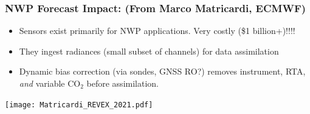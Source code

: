 \documentclass[10pt,t]{beamer}
\begin{document}
\begin{frame}
  \frametitle{NWP Forecast Impact: \small (From Marco Matricardi, ECMWF)}
  \vspace{-0.1in}
  \begin{small}
  \begin{itemize}
  \item Sensors exist primarily for NWP applications.  Very costly (\$1 billion+)!!!!
  \item They ingest radiances (small subset of channels) for data assimilation
  \item Dynamic bias correction (via sondes, GNSS RO?) removes instrument, RTA, \textit{and} variable CO$_2$ before assimilation.
\end{itemize}
  \end{small}
  \vspace{-0.45in}
  \texttt{[image: Matricardi\_REVEX\_2021.pdf]}
\end{frame}
\end{document}
